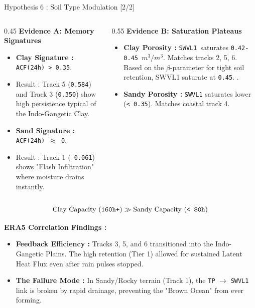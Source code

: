 \documentclass[8pt, aspectratio=169]{beamer}
\begin{document}
\begin{frame}{Hypothesis 6 : Soil Type Modulation [2/2]}
    \footnotesize
    \vspace{-0.1cm}
    \begin{columns}
        \begin{column}{0.45\textwidth}
            \textbf{Evidence A: Memory Signatures}
            \begin{itemize}
                \item \textbf{Clay Signature :} \texttt{ACF(24h) > 0.35}.
                \item Result : Track 5 (\texttt{0.584}) and Track 3 (\texttt{0.350}) show high persistence typical of the Indo-Gangetic Clay.
                \item \textbf{Sand Signature :} \texttt{ACF(24h) $\approx$ 0}.
                \item Result : Track 1 (\texttt{-0.061}) shows "Flash Infiltration" where moisture drains instantly.
            \end{itemize}
        \end{column}

        \begin{column}{0.55\textwidth}
            \textbf{Evidence B: Saturation Plateaus}
            \begin{itemize}
                \item \textbf{Clay Porosity :} \texttt{SWVL1 }saturates \texttt{0.42-0.45 $m^3/m^3$}. Matches tracks 2, 5, 6. Based on the $\beta$-parameter for tight soil retention, SWVL1 saturate at \texttt{0.45}. \cite{clapp1978empirical}.
                \item \textbf{Sandy Porosity :} \texttt{SWVL1} saturates lower (\texttt{< 0.35}). Matches coastal track 4.
            \end{itemize}
        \end{column}
    \end{columns}

    \vspace{0.2cm}
    \begin{equation*}
        \text{Clay Capacity (\texttt{160h+})} \gg \text{Sandy Capacity (\texttt{< 80h})}
    \end{equation*}

    \vspace{0.1cm}
    \footnotesize
    \textbf{ERA5 Correlation Findings :}
    \begin{itemize}
        \item \textbf{Feedback Efficiency :} Tracks 3, 5, and 6 transitioned into the Indo-Gangetic Plains. The high retention (Tier 1) allowed for sustained Latent Heat Flux even after rain pulses stopped.
        \item \textbf{The Failure Mode :} In Sandy/Rocky terrain (Track 1), the \texttt{TP} $\rightarrow$ \texttt{SWVL1} link is broken by rapid drainage, preventing the "Brown Ocean" from ever forming. \cite{wakefield2021}
    \end{itemize}
\end{frame}
\end{document}
